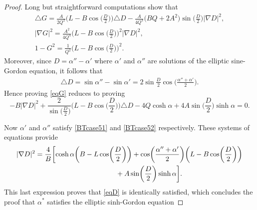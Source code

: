 \documentclass[10pt,a4paper]{amsart}
\numberwithin{equation}{section}
\begin{document}
\begin{proof}
Long but straightforward computations show that
\begin{gather*}
 \triangle G = \frac{A}{2 Q^2}\biggl(L-B\cos\biggl(\frac{D}{2}\biggr) \biggr) {\triangle D}
-\frac{A}{4Q^3}\bigl(BQ+2A^2\bigr)\sin \biggl(\frac{D}{2}\biggr) |\nabla D|^2, \\
 |\nabla G|^2 = \frac{A^2}{4 Q^4}\biggl(L-B\cos\biggl(\frac{D}{2}\biggr) \biggr)^2 |\nabla D|^2,\\
 1-G^2 = \frac{1}{Q^2}\biggl(L-B\cos\biggl(\frac{D}{2}\biggr) \biggr)^2.
\end{gather*}
Moreover, since $D=\alpha''-\alpha'$ where $\alpha'$ and $\alpha''$ are solutions of the elliptic sine-Gordon equation, it follows that
\begin{eqnarray*}
 \triangle D=\sin \alpha''-\sin \alpha'= 2\sin\frac{D}{2}\cos\biggl(\frac{\alpha''+\alpha'}{2}\biggr).
\end{eqnarray*}
Hence proving \eqref{eqG} reduces to proving
\begin{equation}\label{eqD}
-B|\nabla D|^2+\frac{2}{\sin\bigl(\frac{D}{2}\bigr)}\biggl(L-B\cos\biggl(\frac{D}{2}\biggr)\biggr)\triangle D-4Q\cosh
\alpha+4A\sin\biggl(\frac{D}{2}\biggr)\sinh\alpha=0.
\end{equation}

Now $\alpha'$ and $\alpha''$ satisfy \eqref{BTcase51} and \eqref{BTcase52} respectively.
These systems of equations provide
\begin{gather*}
 |\nabla D|^2= \frac{4}{B}
 \biggl[\cosh \alpha \biggl( B-L\cos\biggl(\frac{D}{2}\biggr)\biggr) +
 \cos \biggl(\frac{\alpha''+\alpha'}{2}\biggr)\biggl( L-B\cos\biggl(\frac{D}{2}\biggr)\biggr)
 \nonumber \\ \hphantom{|\nabla D|^2= \frac{4}{B}\biggl[}{}
 + A\sin \biggl(\frac{D}{2}\biggr)\sinh \alpha\biggr].
\end{gather*}
This last expression proves that \eqref{eqD} is identically satisfied, which concludes the proof that
$\alpha^*$ satisfies the elliptic sinh-Gordon equation
\end{proof}
\end{document}
